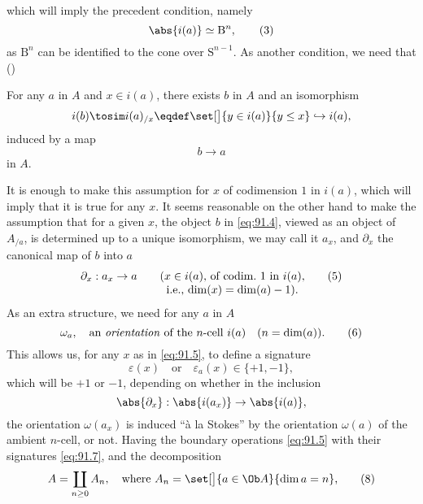 which will imply the precedent condition, namely
\begin{equation}
  \label{eq:91.3}
  \abs{i(a)}\simeq \mathrm B^n,\tag{3}
\end{equation}
as $\mathrm B^n$ can be identified to the cone over $\mathrm
S^{n-1}$. As another condition, we need that
\medbreak
\noindent()\hfill%
\parbox[t]{0.9\textwidth}{For any $a$ in $A$ and $x\in i(a)$, there
  exists $b$ in $A$ and an isomorphism
  \[i(b)\tosim i(a)_{/x} \eqdef\set[\big]{y\in i(a)}{y\le x}
  \hookrightarrow i(a),\]
  induced by a map
  \[b\to a\]
  in $A$.}\par
\medbreak
\noindent It is enough to make this assumption for $x$ of codimension
$1$ in $i(a)$, which will imply that it is true for any $x$. It seems
reasonable on the other hand to make the assumption that for a given
$x$, the object $b$ in \eqref{eq:91.4}, viewed as an object of
$A_{/a}$, is determined up to a unique isomorphism, we may call it
$a_x$, and $\partial_x$ the canonical map of $b$ into $a$
\begin{equation}
  \label{eq:91.5}
  \partial_x:a_x\to a \qquad
  \begin{tabular}[t]{@{}c@{}}
    ($x\in i(a)$, of codim.\ $1$ in $i(a)$, \\
    i.e., $\dim(x)=\dim(a)-1$).
  \end{tabular}
  \tag{5}
\end{equation}
As an extra structure, we need for any $a$ in $A$
\begin{equation}
  \label{eq:91.6}
  \omega_a,\quad\text{an \emph{orientation} of the $n$-cell
    $i(a)$}\quad(n=\dim(a)).\tag{6}
\end{equation}
This allows us, for any $x$ as in \eqref{eq:91.5}, to define a
signature
\begin{equation}
  \label{eq:91.7}
  \varepsilon(x)\quad\text{or}\quad \varepsilon_a(x)\in\{+1,-1\},\tag{7}
\end{equation}
which will be $+1$ or $-1$, depending on whether in the
inclusion
\[\abs{\partial_x}:\abs{i(a_x)}\to\abs{i(a)},\]
the orientation $\omega(a_x)$ is induced ``à la Stokes'' by the
orientation $\omega(a)$ of the ambient $n$-cell, or not. Having the
boundary operations \eqref{eq:91.5} with their signatures
\eqref{eq:91.7}, and the decomposition
\begin{equation}
  \label{eq:91.8}
  A = \coprod_{n\ge0} A_n,\quad\text{where $A_n=\set[\big]{a\in\Ob A}{\dim
      a=n}$,}\tag{8}
\end{equation}
